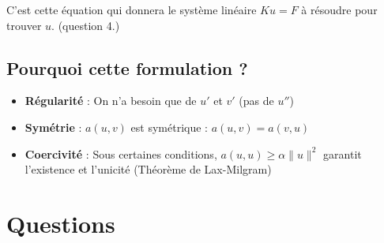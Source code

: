 \documentclass[11pt,a4paper]{report}
\begin{document}
C'est cette équation qui donnera le système linéaire $Ku = F$ à résoudre pour trouver $u$. (question 4.)


\subsection*{Pourquoi cette formulation ?}

\begin{itemize}
    \item \textbf{Régularité} : On n'a besoin que de $u' $ et $v'$ (pas de $u''$)
    \item \textbf{Symétrie} : $a(u,v)$ est symétrique : $a(u,v) = a(v,u)$
    \item \textbf{Coercivité} : Sous certaines conditions, $a(u,u) \geq \alpha \|u\|^2$ garantit l'existence et l'unicité (Théorème de Lax-Milgram)
\end{itemize}

\section*{Questions}
\end{document}
